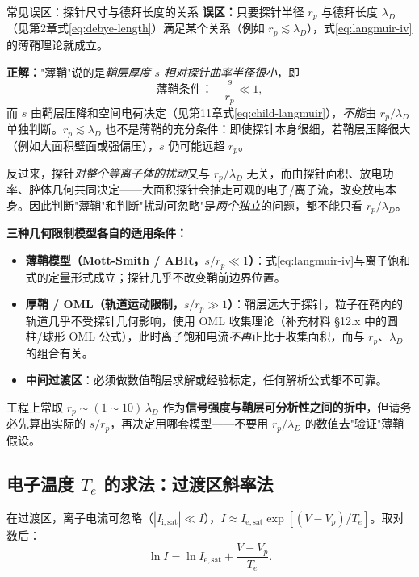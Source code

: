 \documentclass[12pt,a4paper,openany,oneside]{book}
\begin{document}
\begin{warning}{常见误区：探针尺寸与德拜长度的关系}{}
\textbf{误区：}只要探针半径 $r_p$ 与德拜长度 $\lambda_D$（见第2章式\eqref{eq:debye-length}）满足某个关系（例如 $r_p\lesssim\lambda_D$），式\eqref{eq:langmuir-iv}的薄鞘理论就成立。

\textbf{正解：}"薄鞘"说的是\emph{鞘层厚度 $s$ 相对探针曲率半径很小}，即
\begin{equation}
\text{薄鞘条件：}\quad \frac{s}{r_p}\ll 1 ,
\label{eq:thin-sheath}
\end{equation}
而 $s$ 由鞘层压降和空间电荷决定（见第11章式\eqref{eq:child-langmuir}），\emph{不能}由 $r_p/\lambda_D$ 单独判断。$r_p\lesssim\lambda_D$ 也不是薄鞘的充分条件：即使探针本身很细，若鞘层压降很大（例如大面积壁面或强偏压），$s$ 仍可能远超 $r_p$。

反过来，探针\emph{对整个等离子体的扰动}又与 $r_p/\lambda_D$ 无关，而由探针面积、放电功率、腔体几何共同决定——大面积探针会抽走可观的电子/离子流，改变放电本身。因此判断"薄鞘"和判断"扰动可忽略"是\emph{两个独立}的问题，都不能只看 $r_p/\lambda_D$。

\textbf{三种几何限制模型各自的适用条件：}
\begin{itemize}
    \item \textbf{薄鞘模型（Mott-Smith / ABR，$s/r_p\ll1$）}：式\eqref{eq:langmuir-iv}与离子饱和式的定量形式成立；探针几乎不改变鞘前边界位置。
    \item \textbf{厚鞘 / OML（轨道运动限制，$s/r_p\gg1$）}：鞘层远大于探针，粒子在鞘内的轨道几乎不受探针几何影响，使用 OML 收集理论（补充材料 \S12.x 中的圆柱/球形 OML 公式），此时离子饱和电流\emph{不再}正比于收集面积，而与 $r_p$、$\lambda_D$ 的组合有关。
    \item \textbf{中间过渡区}：必须做数值鞘层求解或经验标定，任何解析公式都不可靠。
\end{itemize}
工程上常取 $r_p\sim(1\sim10)\,\lambda_D$ 作为\textbf{信号强度与鞘层可分析性之间的折中}，但请务必先算出实际的 $s/r_p$，再决定用哪套模型——不要用 $r_p/\lambda_D$ 的数值去"验证"薄鞘假设。
\end{warning}

\subsection{电子温度 $T_e$ 的求法：过渡区斜率法}

在过渡区，离子电流可忽略（$|I_{\mathrm{i,sat}}| \ll I$），$I \approx I_{\mathrm{e,sat}}\exp[(V - V_p)/T_e]$。取对数后：
\begin{equation}
\ln I = \ln I_{\mathrm{e,sat}} + \frac{V - V_p}{T_e}.
\label{eq:ch12-probe-current}
\end{equation}
\end{document}
